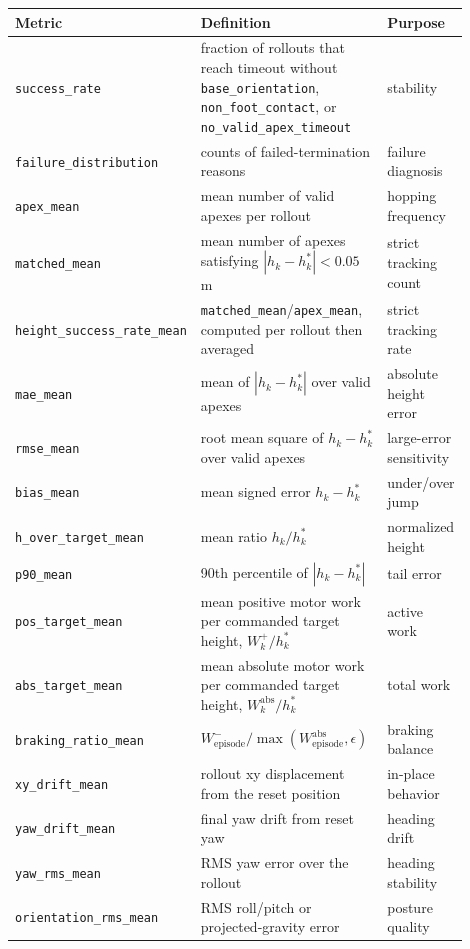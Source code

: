 \documentclass[11pt, a4paper]{article}
\begin{document}
\begin{center}
\scriptsize
\begin{tabular}{p{0.28\linewidth}p{0.48\linewidth}p{0.14\linewidth}}
\hline
Metric & Definition & Purpose \\
\hline
\texttt{success\_rate} &
fraction of rollouts that reach timeout without
\texttt{base\_orientation}, \texttt{non\_foot\_contact}, or
\texttt{no\_valid\_apex\_timeout} &
stability \\
\texttt{failure\_distribution} &
counts of failed-termination reasons &
failure diagnosis \\
\texttt{apex\_mean} &
mean number of valid apexes per rollout &
hopping frequency \\
\texttt{matched\_mean} &
mean number of apexes satisfying $|h_k-h^*_k|<0.05$ m &
strict tracking count \\
\texttt{height\_success\_rate\_mean} &
\texttt{matched\_mean}/\texttt{apex\_mean}, computed per rollout then averaged &
strict tracking rate \\
\texttt{mae\_mean} &
mean of $|h_k-h^*_k|$ over valid apexes &
absolute height error \\
\texttt{rmse\_mean} &
root mean square of $h_k-h^*_k$ over valid apexes &
large-error sensitivity \\
\texttt{bias\_mean} &
mean signed error $h_k-h^*_k$ &
under/over jump \\
\texttt{h\_over\_target\_mean} &
mean ratio $h_k/h^*_k$ &
normalized height \\
\texttt{p90\_mean} &
90th percentile of $|h_k-h^*_k|$ &
tail error \\
\texttt{pos\_target\_mean} &
mean positive motor work per commanded target height, $W_k^+/h^*_k$ &
active work \\
\texttt{abs\_target\_mean} &
mean absolute motor work per commanded target height,
$W_k^{\mathrm{abs}}/h^*_k$ &
total work \\
\texttt{braking\_ratio\_mean} &
$W^-_{\mathrm{episode}}/\max(W^{\mathrm{abs}}_{\mathrm{episode}},\epsilon)$ &
braking balance \\
\texttt{xy\_drift\_mean} &
rollout xy displacement from the reset position &
in-place behavior \\
\texttt{yaw\_drift\_mean} &
final yaw drift from reset yaw &
heading drift \\
\texttt{yaw\_rms\_mean} &
RMS yaw error over the rollout &
heading stability \\
\texttt{orientation\_rms\_mean} &
RMS roll/pitch or projected-gravity error &
posture quality \\
\hline
\end{tabular}
\end{center}
\end{document}
